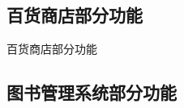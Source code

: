 \documentclass{ctexbeamer}
\begin{document}
\subsection{百货商店部分功能}
\begin{frame}{百货商店部分功能}
\end{frame}

\subsection{图书管理系统部分功能}
\end{document}
